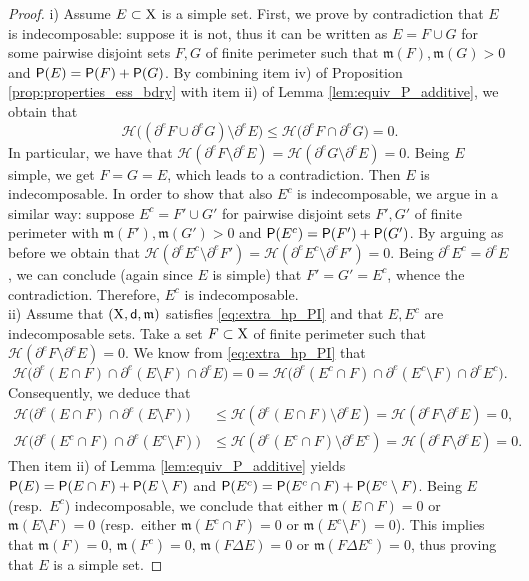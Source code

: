 \documentclass[reqno]{amsart}
\numberwithin{equation}{section}
\newcommand{\X}{{\rm X}}
\newcommand{\sfd}{{\sf d}}
\newcommand{\mm}{\mathfrak m}
\newcommand{\1}{\mathbbm 1}
\renewcommand{\P}{{\sf P}}
\renewcommand{\H}{{\mathcal H}}
\begin{document}
\begin{proof}
{\color{blue}i)} Assume \(E\subset\X\) is a simple set. First, we prove by
contradiction that \(E\) is indecomposable: suppose it is not, thus it can
be written as \(E=F\cup G\) for some pairwise disjoint sets \(F,G\) of
finite perimeter such that \(\mm(F),\mm(G)>0\) and \(\P(E)=\P(F)+\P(G)\).
By combining item iv) of Proposition \ref{prop:properties_ess_bdry} with
item ii) of Lemma \ref{lem:equiv_P_additive}, we obtain that
\[
\H\big((\partial^e F\cup\partial^e G)\setminus\partial^e E\big)
\leq\H\big(\partial^e F\cap\partial^e G\big)=0.
\]
In particular, we have that
\(\H(\partial^e F\setminus\partial^e E)=\H(\partial^e G\setminus\partial^e E)=0\).
Being \(E\) simple, we get \(F=G=E\), which leads to
a contradiction. Then \(E\) is indecomposable. In order to show that
also \(E^c\) is indecomposable, we argue in a similar way: suppose
\(E^c=F'\cup G'\) for pairwise disjoint sets \(F',G'\) of
finite perimeter with \(\mm(F'),\mm(G')>0\) and \(\P(E^c)=\P(F')+\P(G')\).
By arguing as before we obtain that
\(\H(\partial^e E^c\setminus\partial^e F')=\H(\partial^e E^c\setminus\partial^e F')=0\).
Being \(\partial^e E^c=\partial^e E\), we can conclude (again since \(E\) is simple)
that \(F'=G'=E^c\), whence the contradiction. Therefore, \(E^c\) is indecomposable.\\
{\color{blue}ii)} Assume that \((\X,\sfd,\mm)\) satisfies \eqref{eq:extra_hp_PI}
and that \(E,E^c\) are indecomposable sets. Take a set \(F\subset\X\) of finite
perimeter such that \(\H(\partial^e F\setminus\partial^e E)=0\). We know from
\eqref{eq:extra_hp_PI} that
\[
\H\big(\partial^e(E\cap F)\cap\partial^e(E\setminus F)\cap\partial^e E\big)=0=
\H\big(\partial^e(E^c\cap F)\cap\partial^e(E^c\setminus F)\cap\partial^e E^c\big).
\]
Consequently, we deduce that
\[\begin{split}
\H\big(\partial^e(E\cap F)\cap\partial^e(E\setminus F)\big)&\leq
\H(\partial^e(E\cap F)\setminus\partial^e E)=\H(\partial^e F\setminus\partial^e E)=0,\\
\H\big(\partial^e(E^c\cap F)\cap\partial^e(E^c\setminus F)\big)&\leq
\H(\partial^e(E^c\cap F)\setminus\partial^e E^c)=\H(\partial^e F\setminus\partial^e E)=0.
\end{split}\]
Then item ii) of Lemma \ref{lem:equiv_P_additive} yields
\(\P(E)=\P(E\cap F)+\P(E\setminus F)\) and \(\P(E^c)=\P(E^c\cap F)+\P(E^c\setminus F)\).
Being \(E\) (resp.\ \(E^c\)) indecomposable, we conclude that
either \(\mm(E\cap F)=0\) or \(\mm(E\setminus F)=0\) (resp.\ either
\(\mm(E^c\cap F)=0\) or \(\mm(E^c\setminus F)=0\)). This implies that
\(\mm(F)=0\), \(\mm(F^c)=0\), \(\mm(F\Delta E)=0\) or \(\mm(F\Delta E^c)=0\),
thus proving that \(E\) is a simple set.
\end{proof}
\end{document}
